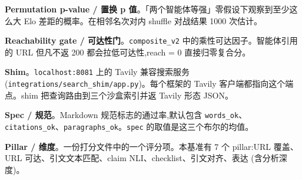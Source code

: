 \documentclass[UTF8,a4paper,12pt,oneside]{ctexart}
\begin{document}
\textbf{Permutation p-value / 置换 p 值}。「两个智能体等强」零假设下观察到至少这么大 Elo 差距的概率。在相邻名次对内 shuffle 对战结果 1000 次估计。

\textbf{Reachability gate / 可达性门}。\texttt{composite\_v2} 中的乘性可达因子。智能体引用的 URL 但凡不返 200 都会拉低可达性,reach = 0 直接归零复合分。

\textbf{Shim}。\texttt{localhost:8081} 上的 Tavily 兼容搜索服务 (\texttt{integrations/search\_shim/app.py})。每个框架的 Tavily 客户端都指向这个端点。shim 把查询路由到三个沙盒索引并返 Tavily 形态 JSON。

\textbf{Spec / 规范}。Markdown 规范标志的通过率,默认包含 \texttt{words\_ok}、\texttt{citations\_ok}、\texttt{paragraphs\_ok}。\texttt{spec} 的取值是这三个布尔的均值。

\textbf{Pillar / 维度}。一份打分文件中的一个评分项。本基准有 7 个 pillar:URL 覆盖、URL 可达、引文文本匹配、claim NLI、checklist、引文对齐、表达 (含分析深度)。
\end{document}
